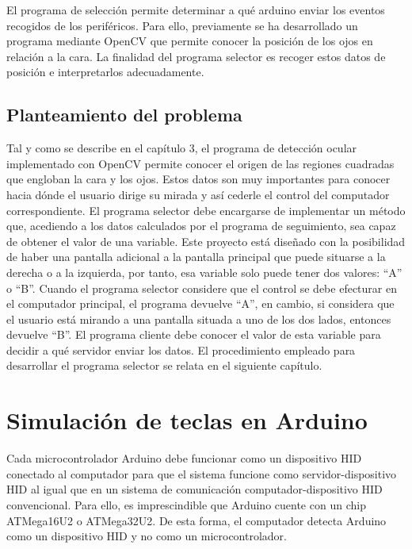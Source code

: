 El programa de selección permite determinar a qué arduino enviar los eventos recogidos de los periféricos. Para ello, previamente se ha desarrollado un programa mediante OpenCV que permite conocer la posición de los ojos en relación a la cara. La finalidad del programa selector es recoger estos datos de posición e interpretarlos adecuadamente.

\subsection{Planteamiento del problema} \label{s2_4_2}

Tal y como se describe en el capítulo 3, el programa de detección ocular implementado con OpenCV permite conocer el origen de las regiones cuadradas que engloban la cara y los ojos. Estos datos son muy importantes para conocer hacia dónde el usuario dirige su mirada y así cederle el control del computador correspondiente. El programa selector debe encargarse de implementar un método que, acediendo a los datos calculados por el programa de seguimiento, sea capaz de obtener el valor de una variable. Este proyecto está diseñado con la posibilidad de haber una pantalla adicional a la pantalla principal que puede situarse a la derecha o a la izquierda, por tanto, esa variable solo puede tener dos valores: ``A'' o ``B''. Cuando el programa selector considere que el control se debe efecturar en el computador principal, el programa devuelve ``A'', en cambio, si considera que el usuario está mirando a una pantalla situada a uno de los dos lados, entonces devuelve ``B''. El programa cliente debe conocer el valor de esta variable para decidir a qué servidor enviar los datos. El procedimiento empleado para desarrollar el programa selector se relata en el siguiente capítulo.






\section{Simulación de teclas en Arduino} \label{s2_5}

Cada microcontrolador Arduino debe funcionar como un dispositivo HID conectado al computador para que el sistema funcione como servidor-dispositivo HID al igual que en un sistema de comunicación computador-dispositivo HID convencional. Para ello, es imprescindible que Arduino cuente con un chip ATMega16U2 o ATMega32U2. De esta forma, el computador detecta Arduino como un dispositivo HID y no como un microcontrolador.

